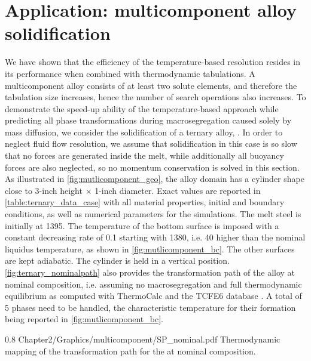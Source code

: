 \section{Application: multicomponent alloy solidification}
%
We have shown that the efficiency of the temperature-based resolution resides in its performance when combined with 
thermodynamic tabulations. A multicomponent alloy consists of at least two solute elements, and 
therefore the tabulation size increases, hence the number of search operations also increases. 
To demonstrate the speed-up ability of the temperature-based approach while predicting all phase 
transformations during macrosegregation caused solely by mass diffusion, we consider the solidification of a ternary alloy, .
In order to neglect fluid flow resolution, we assume that solidification in this case is so slow that no forces are generated inside the melt, while
additionally all buoyancy forces are also neglected, so no momentum conservation is solved in this section.
As illustrated in \cref{fig:mutlicomponent_geo}, the alloy domain has a cylinder shape close to 3-inch height $\times$ 1-inch diameter. 
Exact values are reported in \cref{table:ternary_data_case} with all material properties, initial and boundary conditions, 
as well as numerical parameters for the simulations. The melt steel is initially at \SI{1395}{\udegC}. The 
temperature of the bottom surface is imposed with a constant decreasing rate of \SI{0.1}{\uCR} starting 
with \SI{1380}{\udegC}, i.e. \SI{40}{\udegC} higher than the nominal liquidus temperature, as shown 
in \cref{fig:mutlicomponent_bc}. The other surfaces are kept adiabatic. The cylinder is held in a vertical position. 
\cref{fig:ternary_nominalpath} also provides the transformation path of the alloy at nominal composition, i.e. assuming no macrosegregation and full 
thermodynamic equilibrium as computed with ThermoCalc and the TCFE6 database \citep{tcfe6_tcfe6:_2010, andersson_thermo-calc_2002}. 
A total of 5 phases need to be handled, the characteristic temperature for their formation being reported 
in \cref{fig:mutlicomponent_bc}.
%
\begin{figureth}
{0.8}
{Chapter2/Graphics/multicomponent/SP_nominal.pdf}
{Thermodynamic mapping \citep{tcfe6_tcfe6:_2010, andersson_thermo-calc_2002} of the transformation path for the  at nominal composition.}
\label{fig:ternary_nominalpath}
\end{figureth}
%
